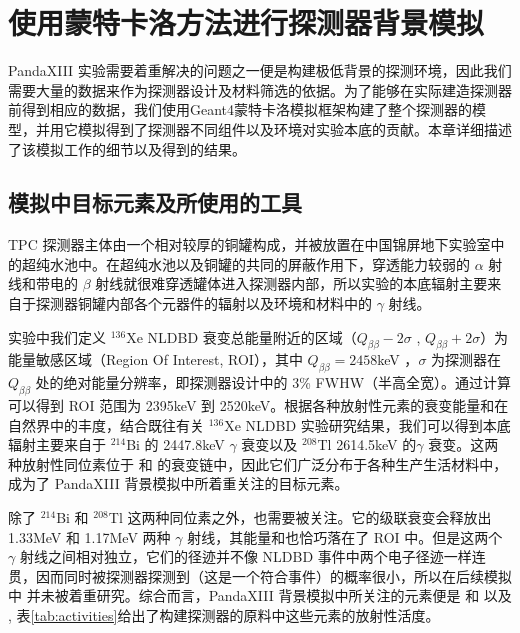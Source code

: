 \chapter{使用蒙特卡洛方法进行探测器背景模拟}
\label{chapter:background}

PandaXIII 实验需要着重解决的问题之一便是构建极低背景的探测环境，因此我们需要大量的数据来作为探测器设计及材料筛选的依据。为了能够在实际建造探测器前得到相应的数据，我们使用Geant4\supercite{Agostinelli:2002hh}蒙特卡洛模拟框架构建了整个探测器的模型，并用它模拟得到了探测器不同组件以及环境对实验本底的贡献。本章详细描述了该模拟工作的细节以及得到的结果。

\section{模拟中目标元素及所使用的工具}

 TPC 探测器主体由一个相对较厚的铜罐构成，并被放置在中国锦屏地下实验室中的超纯水池中。在超纯水池以及铜罐的共同的屏蔽作用下，穿透能力较弱的 $\alpha$ 射线和带电的 $\beta$ 射线就很难穿透罐体进入探测器内部，所以实验的本底辐射主要来自于探测器铜罐内部各个元器件的辐射以及环境和材料中的 $\gamma$ 射线。

实验中我们定义 $^{136}$Xe NLDBD 衰变总能量附近的区域（$Q_{\beta\beta}-2\sigma$ , $Q_{\beta\beta}+2\sigma$）为能量敏感区域（Region Of Interest, ROI），其中 $Q_{\beta\beta}=2458$keV ，$\sigma$ 为探测器在 $Q_{\beta\beta}$ 处的绝对能量分辨率，即探测器设计中的 3\% FWHW（半高全宽）。通过计算可以得到 ROI 范围为 2395keV 到 2520keV。根据各种放射性元素的衰变能量和在自然界中的丰度，结合既往有关 $^{136}$Xe NLDBD 实验研究结果，我们可以得到本底辐射主要来自于 $^{214}$Bi 的 2447.8keV $\gamma$ 衰变以及 $^{208}$Tl  2614.5keV 的$\gamma$ 衰变。这两种放射性同位素位于 \utte 和 \thttt 的衰变链中，因此它们广泛分布于各种生产生活材料中，成为了 PandaXIII 背景模拟中所着重关注的目标元素。

除了 $^{214}$Bi 和 $^{208}$Tl 这两种同位素之外，\cose 也需要被关注。它的级联衰变会释放出 1.33MeV 和 1.17MeV 两种 $\gamma$ 射线，其能量和也恰巧落在了 ROI 中。但是这两个 $\gamma$ 射线之间相对独立，它们的径迹并不像 NLDBD 事件中两个电子径迹一样连贯，因而同时被探测器探测到（这是一个符合事件）的概率很小，所以在后续模拟中 \cose 并未被着重研究。综合而言，PandaXIII 背景模拟中所关注的元素便是 \utte 和 \thttt 以及 \cose  , 表\ref{tab:activities}给出了构建探测器的原料中这些元素的放射性活度。

